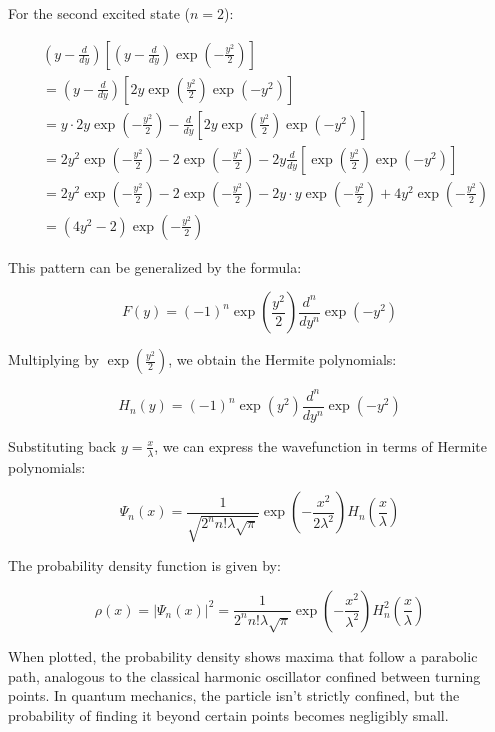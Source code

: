 \documentclass[italian]{HKNdocument}
\begin{document}
For the second excited state ($n=2$):

\begin{align*}
&\left(y-\frac{d}{dy}\right)\left[\left(y-\frac{d}{dy}\right)\exp\left(-\frac{y^2}{2}\right)\right] \\
&= \left(y-\frac{d}{dy}\right)\left[2y\exp\left(\frac{y^2}{2}\right)\exp(-y^2)\right] \\
&= y\cdot 2y\exp\left(-\frac{y^2}{2}\right) - \frac{d}{dy}\left[2y\exp\left(\frac{y^2}{2}\right)\exp(-y^2)\right] \tag{5.50} \\
&= 2y^2\exp\left(-\frac{y^2}{2}\right) - 2\exp\left(-\frac{y^2}{2}\right) - 2y\frac{d}{dy}\left[\exp\left(\frac{y^2}{2}\right)\exp(-y^2)\right] \\
&= 2y^2\exp\left(-\frac{y^2}{2}\right) - 2\exp\left(-\frac{y^2}{2}\right) - 2y\cdot y\exp\left(-\frac{y^2}{2}\right) + 4y^2\exp\left(-\frac{y^2}{2}\right) \\
&= (4y^2-2)\exp\left(-\frac{y^2}{2}\right)
\end{align*}

This pattern can be generalized by the formula:

\begin{equation*}
F(y) = (-1)^n\exp\left(\frac{y^2}{2}\right)\frac{d^n}{dy^n}\exp(-y^2) \tag{5.51}
\end{equation*}

Multiplying by $\exp\left(\frac{y^2}{2}\right)$, we obtain the Hermite polynomials:

\begin{equation*}
H_n(y) = (-1)^n\exp(y^2)\frac{d^n}{dy^n}\exp(-y^2) \tag{5.52}
\end{equation*}

Substituting back $y=\frac{x}{\lambda}$, we can express the wavefunction in terms of Hermite polynomials:

\begin{equation*}
\Psi_n(x) = \frac{1}{\sqrt{2^n n!\lambda\sqrt{\pi}}}\exp\left(-\frac{x^2}{2\lambda^2}\right)H_n\left(\frac{x}{\lambda}\right) \tag{5.53}
\end{equation*}

The probability density function is given by:

\begin{equation*}
\rho(x) = |\Psi_n(x)|^2 = \frac{1}{2^n n!\lambda\sqrt{\pi}}\exp\left(-\frac{x^2}{\lambda^2}\right)H_n^2\left(\frac{x}{\lambda}\right) \tag{5.54}
\end{equation*}

When plotted, the probability density shows maxima that follow a parabolic path, analogous to the classical harmonic oscillator confined between turning points. In quantum mechanics, the particle isn't strictly confined, but the probability of finding it beyond certain points becomes negligibly small.
\end{document}
